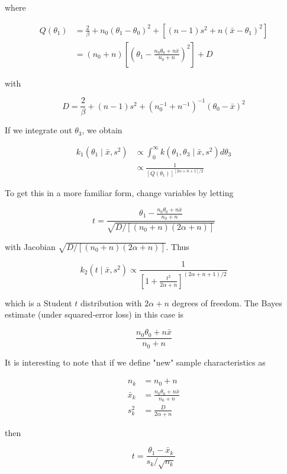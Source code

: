 where

$$
\begin{aligned}
Q\left(\theta_{1}\right) & =\frac{2}{\beta}+n_{0}\left(\theta_{1}-\theta_{0}\right)^{2}+\left[(n-1) s^{2}+n\left(\bar{x}-\theta_{1}\right)^{2}\right] \\
& =\left(n_{0}+n\right)\left[\left(\theta_{1}-\frac{n_{0} \theta_{0}+n \bar{x}}{n_{0}+n}\right)^{2}\right]+D
\end{aligned}
$$

with

$$
D=\frac{2}{\beta}+(n-1) s^{2}+\left(n_{0}^{-1}+n^{-1}\right)^{-1}\left(\theta_{0}-\bar{x}\right)^{2}
$$

If we integrate out $\theta_{3}$, we obtain

$$
\begin{aligned}
k_{1}\left(\theta_{1} \mid \bar{x}, s^{2}\right) & \propto \int_{0}^{\infty} k\left(\theta_{1}, \theta_{3} \mid \bar{x}, s^{2}\right) d \theta_{3} \\
& \propto \frac{1}{\left[Q\left(\theta_{1}\right)\right]^{[2 \alpha+n+1] / 2}}
\end{aligned}
$$

To get this in a more familiar form, change variables by letting

$$
t=\frac{\theta_{1}-\frac{n_{0} \theta_{0}+n \bar{x}}{n_{0}+n}}{\sqrt{D /\left[\left(n_{0}+n\right)(2 \alpha+n)\right]}}
$$

with Jacobian $\sqrt{D /\left[\left(n_{0}+n\right)(2 \alpha+n)\right]}$. Thus

$$
k_{2}\left(t \mid \bar{x}, s^{2}\right) \propto \frac{1}{\left[1+\frac{t^{2}}{2 \alpha+n}\right]^{(2 \alpha+n+1) / 2}}
$$

which is a Student $t$ distribution with $2 \alpha+n$ degrees of freedom. The Bayes estimate (under squared-error loss) in this case is

$$
\frac{n_{0} \theta_{0}+n \bar{x}}{n_{0}+n}
$$

It is interesting to note that if we define "new" sample characteristics as

$$
\begin{aligned}
n_{k} & =n_{0}+n \\
\bar{x}_{k} & =\frac{n_{0} \theta_{0}+n \bar{x}}{n_{0}+n} \\
s_{k}^{2} & =\frac{D}{2 \alpha+n}
\end{aligned}
$$

then

$$
t=\frac{\theta_{1}-\bar{x}_{k}}{s_{k} / \sqrt{n_{k}}}
$$

